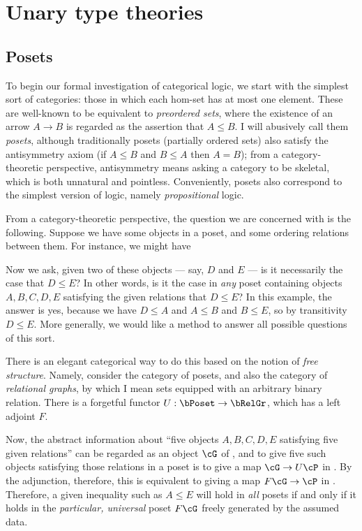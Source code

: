 \documentclass{book}
\begin{document}
\chapter{Unary type theories}
\label{chap:unary}


\section{Posets}
\label{sec:poset}


To begin our formal investigation of categorical logic, we start with the simplest sort of categories: those in which each hom-set has at most one element.
These are well-known to be equivalent to \emph{preordered sets}, where the existence of an arrow $A\to B$ is regarded as the assertion that $A\le B$.
I will abusively call them \emph{posets}, although traditionally posets (partially ordered sets) also satisfy the antisymmetry axiom (if $A\le B$ and $B\le A$ then $A=B$); from a category-theoretic perspective, antisymmetry means asking a category to be skeletal, which is both unnatural and pointless.
Conveniently, posets also correspond to the simplest version of logic, namely \emph{propositional} logic.

From a category-theoretic perspective, the question we are concerned with is the following.
Suppose we have some objects in a poset, and some ordering relations between them.
For instance, we might have
Now we ask, given two of these objects --- say, $D$ and $E$ --- is it necessarily the case that $D\le E$?
In other words, is it the case in \emph{any} poset containing objects $A,B,C,D,E$ satisfying the given relations that $D\le E$?
In this example, the answer is yes, because we have $D\le A$ and  $A\le B$ and $B\le E$, so by transitivity $D\le E$.
More generally, we would like a method to answer all possible questions of this sort.

There is an elegant categorical way to do this based on the notion of \emph{free structure}.
Namely, consider the category \bPoset of posets, and also the category \bRelGr of \emph{relational graphs}, by which I mean sets equipped with an arbitrary binary relation.
There is a forgetful functor $U:\bPoset \to \bRelGr$, which has a left adjoint $F$.

Now, the abstract information about ``five objects $A,B,C,D,E$ satisfying five given relations'' can be regarded as an object $\cG$ of \bRelGr, and to give five such objects satisfying those relations in a poset \cP is to give a map $\cG \to U\cP$ in \bRelGr.
By the adjunction, therefore, this is equivalent to giving a map $F\cG \to \cP$ in \bPoset.
Therefore, a given inequality such as $A\le E$ will hold in \emph{all} posets if and only if it holds in the \emph{particular, universal} poset $F\cG$ freely generated by the assumed data.
\end{document}
